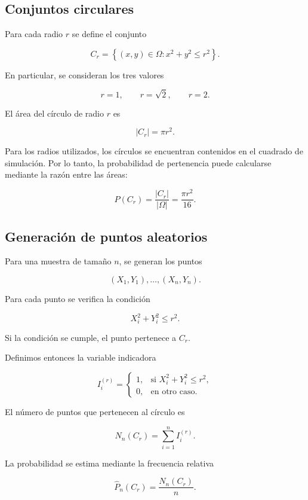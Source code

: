 \documentclass[12pt,a4paper]{article}
\begin{document}
\subsection{Conjuntos circulares}

Para cada radio \(r\) se define el conjunto

\[
C_r=
\left\{
(x,y)\in\Omega:
x^2+y^2\leq r^2
\right\}.
\]

En particular, se consideran los tres valores

\[
r=1,\qquad r=\sqrt{2},\qquad r=2.
\]

El área del círculo de radio \(r\) es

\[
|C_r|=\pi r^2.
\]

Para los radios utilizados, los círculos se encuentran contenidos en el
cuadrado de simulación. Por lo tanto, la probabilidad de pertenencia
puede calcularse mediante la razón entre las áreas:

\[
P(C_r)
=
\frac{|C_r|}{|\Omega|}
=
\frac{\pi r^2}{16}.
\]

\subsection{Generación de puntos aleatorios}

Para una muestra de tamaño \(n\), se generan los puntos

\[
(X_1,Y_1),\ldots,(X_n,Y_n).
\]

Para cada punto se verifica la condición

\[
X_i^2+Y_i^2\leq r^2.
\]

Si la condición se cumple, el punto pertenece a \(C_r\).

Definimos entonces la variable indicadora

\[
I_i^{(r)}
=
\begin{cases}
1, & \text{si }X_i^2+Y_i^2\leq r^2,\\
0, & \text{en otro caso}.
\end{cases}
\]

El número de puntos que pertenecen al círculo es

\[
N_n(C_r)=
\sum_{i=1}^{n}I_i^{(r)}.
\]

La probabilidad se estima mediante la frecuencia relativa

\[
\widehat{P}_n(C_r)
=
\frac{N_n(C_r)}{n}.
\]

\end{document}
